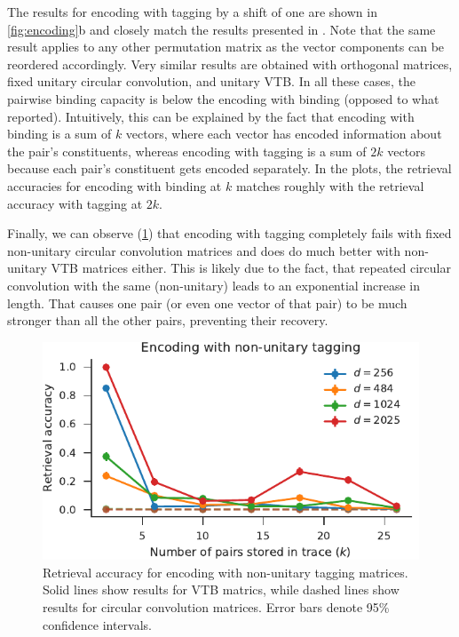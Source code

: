 The results for encoding with tagging by a shift of one are shown in \cref{fig:encoding}b and closely match the results presented in \textcite{recchia2015}.
Note that the same result applies to any other permutation matrix as the vector components can be reordered accordingly.
Very similar results are obtained with orthogonal matrices, fixed unitary circular convolution, and unitary VTB\@.
In all these cases, the pairwise binding capacity is below the encoding with binding (opposed to what \textcite{recchia2015} reported).
Intuitively, this can be explained by the fact that encoding with binding is a sum of $k$ vectors, where each vector has encoded information about the pair's constituents, whereas encoding with tagging is a sum of $2k$ vectors because each pair's constituent gets encoded separately.
In the plots, the retrieval accuracies for encoding with binding at $k$ matches roughly with the retrieval accuracy with tagging at $2k$.

Finally, we can observe (\cref{fig:encoding-nonunitary-tagging}) that encoding with tagging completely fails with fixed non-unitary circular convolution matrices and does do much better with non-unitary VTB matrices either.
This is likely due to the fact, that repeated circular convolution with the same (non-unitary) leads to an exponential increase in length.
That causes one pair (or even one vector of that pair) to be much stronger than all the other pairs, preventing their recovery.
\begin{figure}
    \centering
    \includegraphics{figures/encoding-nonunitary-tagging}
    \caption{Retrieval accuracy for encoding with non-unitary tagging matrices. Solid lines show results for VTB matrics, while dashed lines show results for circular convolution matrices. Error bars denote 95\% confidence intervals.}\label{fig:encoding-nonunitary-tagging}
\end{figure}

